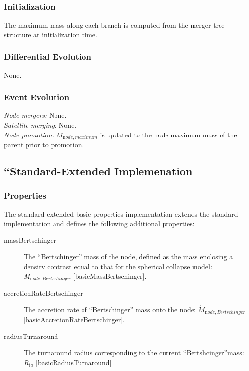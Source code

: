 \subsubsection{Initialization}

The maximum mass along each branch is computed from the merger tree structure at initialization time.

\subsubsection{Differential Evolution}

None.

\subsubsection{Event Evolution}

\noindent\emph{Node mergers:} None.\\

\noindent\emph{Satellite merging:} None.\\

\noindent\emph{Node promotion:} $M_{\mathrm node, maximum}$ is updated to the \gls{node} maximum mass of the parent prior to promotion.\\

\subsection{``Standard-Extended Implemenation}

\subsubsection{Properties}

The standard-extended basic properties implementation extends the standard implementation and defines the following additional properties:
\begin{description}
 \item [{\normalfont \ttfamily massBertschinger}] The ``Bertschinger'' mass of the node, defined as the mass enclosing a density contrast equal to that for the spherical collapse model: $M_{\mathrm node, Bertschinger}$ [{\normalfont \ttfamily basicMassBertschinger}].
 \item [{\normalfont \ttfamily accretionRateBertschinger}] The accretion rate of ``Bertschinger'' mass onto the node: $\dot{M}_{\mathrm node, Bertschinger}$ [{\normalfont \ttfamily basicAccretionRateBertschinger}].
 \item [{\normalfont \ttfamily radiusTurnaround}] The turnaround radius corresponding to the current ``Bertshcinger''mass: $R_{\mathrm ta}$ [{\normalfont \ttfamily basicRadiusTurnaround}]
\end{description}

